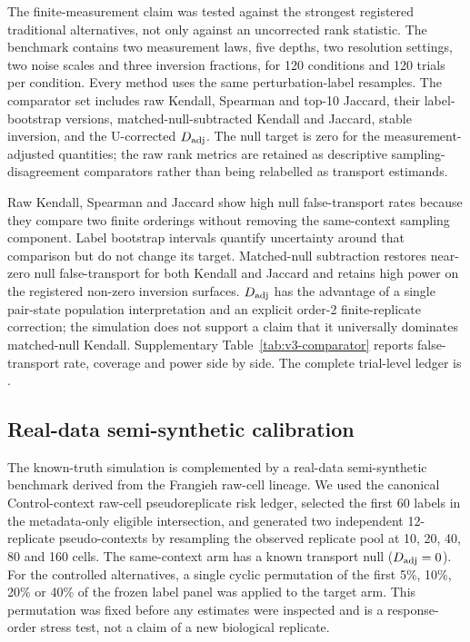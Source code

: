 \documentclass{article}
\begin{document}
The finite-measurement claim was tested against the strongest registered
traditional alternatives, not only against an uncorrected rank statistic. The
benchmark contains two measurement laws, five depths, two resolution settings,
two noise scales and three inversion fractions, for 120 conditions and 120
trials per condition. Every method uses the same perturbation-label resamples.
The comparator set includes raw Kendall, Spearman and top-10 Jaccard, their
label-bootstrap versions, matched-null-subtracted Kendall and Jaccard, stable
inversion, and the U-corrected $D_{\rm adj}$. The null target is zero for the
measurement-adjusted quantities; the raw rank metrics are retained as
descriptive sampling-disagreement comparators rather than being relabelled as
transport estimands.

Raw Kendall, Spearman and Jaccard show high null false-transport rates because
they compare two finite orderings without removing the same-context sampling
component. Label bootstrap intervals quantify uncertainty around that
comparison but do not change its target. Matched-null subtraction restores
near-zero null false-transport for both Kendall and Jaccard and retains high
power on the registered non-zero inversion surfaces. $D_{\rm adj}$ has the
advantage of a single pair-state population interpretation and an explicit
order-2 finite-replicate correction; the simulation does not support a claim
that it universally dominates matched-null Kendall. Supplementary
Table~\ref{tab:v3-comparator} reports false-transport rate, coverage and power
side by side. The complete trial-level ledger is
.



\subsection{Real-data semi-synthetic calibration}
\label{app:realdata-semisynthetic}

The known-truth simulation is complemented by a real-data semi-synthetic
benchmark derived from the Frangieh raw-cell lineage. We used the canonical
Control-context raw-cell pseudoreplicate risk ledger, selected the first 60
labels in the metadata-only eligible intersection, and generated two
independent 12-replicate pseudo-contexts by resampling the observed
replicate pool at 10, 20, 40, 80 and 160 cells. The same-context arm has a
known transport null ($D_{\rm adj}=0$). For the controlled alternatives, a
single cyclic permutation of the first 5\%, 10\%, 20\% or 40\% of the frozen
label panel was applied to the target arm. This permutation was fixed before
any estimates were inspected and is a response-order stress test, not a
claim of a new biological replicate.
\end{document}
